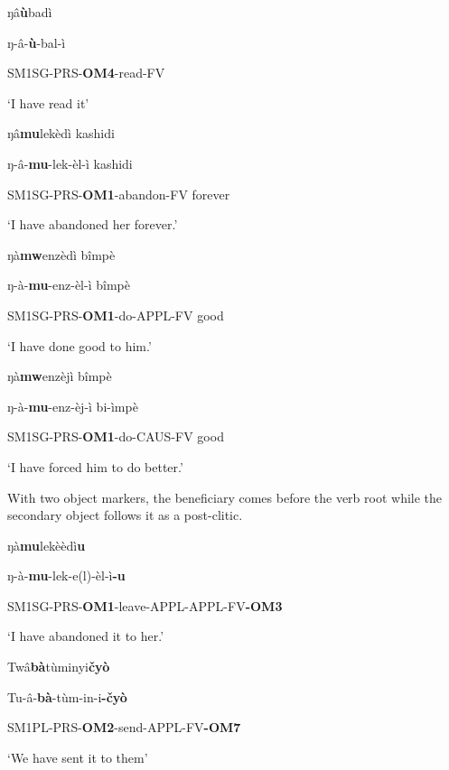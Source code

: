 \documentclass[output=paper]{langscibook}
\begin{document}
\ea%
    \label{ex:lukusa:20}
    \z

          ŋâ\textbf{ù}badì  

    ŋ-â-\textbf{ù}{}-bal-ì  

     SM1SG-PRS-\textbf{OM4}{}-read-FV  

\glt ‘I have read it’

\ea%
    \label{ex:lukusa:21}
    \z

          ŋâ\textbf{mu}lekèdì kashidi    

ŋ-â-\textbf{mu}{}-lek-èl-ì            kashidi  

    SM1SG-PRS-\textbf{OM1}{}-abandon-FV   forever  

\glt ‘I have abandoned her forever.’

\ea%
    \label{ex:lukusa:22}
    \z

          ŋà\textbf{mw}enzèdì bîmpè  

    ŋ-à-\textbf{mu}{}-enz-èl-ì            bîmpè

    SM1SG-PRS-\textbf{OM1}{}-do-APPL-FV  good

\glt ‘I have done good to him.’

\ea%
    \label{ex:lukusa:23}
    \z

          ŋà\textbf{mw}enzèjì bîmpè  

    ŋ-à-\textbf{mu}{}-enz-èj-ì            bi-{ì}mpè

    SM1SG-PRS-\textbf{OM1}{}-do-CAUS-FV  good

\glt ‘I have forced him to do better.’

With two object markers, the beneficiary comes before the verb root while the secondary object follows it as a post-clitic.

\ea%
    \label{ex:lukusa:24}
    \z

          ŋà\textbf{mu}lekèèdì\textbf{u}    

    ŋ{}-à-\textbf{mu}{}-lek-e(l)-èl-ì\textbf{{}-u}

    SM1SG-PRS-\textbf{OM1}{}-leave-APPL-APPL-FV\textbf{{}-OM3}  

\glt ‘I have abandoned it to her.’

\ea%
    \label{ex:lukusa:25}
    \z

          Twâ\textbf{bà}tùminyi\textbf{čyò}  

    Tu-â-\textbf{bà}{}-tùm-in-i\textbf{{}-čyò}  

    SM1PL-PRS-\textbf{OM2}{}-send-APPL-FV\textbf{{}-OM7}  

\glt ‘We have sent it to them’
\end{document}
